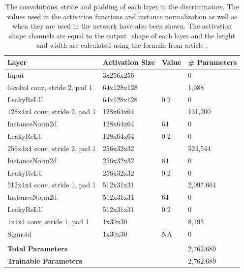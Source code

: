 \documentclass[12pt, fleqn, titlepage]{article}
\begin{document}
\begin{table}[H]
	\centering
	\begin{tabular}{llll}\toprule
		Layer                         & Activation Size & Value & \# Parameters \\ \midrule
		Input                         & 3x256x256       &       & 0             \\
		64x4x4 conv, stride 2, pad 1  & 64x128x128      &       & 1,088         \\
		LeakyReLU                     & 64x128x128      & 0.2   & 0             \\
		128x4x4 conv, stride 2, pad 1 & 128x64x64       &       & 131,200       \\
		InstanceNorm2d                & 128x64x64       & 64    & 0             \\
		LeakyReLU                     & 128x64x64       & 0.2   & 0             \\
		256x4x4 conv, stride 2, pad 1 & 256x32x32       &       & 524,544       \\
		InstanceNorm2d                & 256x32x32       & 64    & 0             \\
		LeakyReLU                     & 256x32x32       & 0.2   & 0             \\
		512x4x4 conv, stride 1, pad 1 & 512x31x31       &       & 2,097,664     \\
		InstanceNorm2d                & 512x31x31       & 64    & 0             \\
		LeakyReLU                     & 512x31x31       & 0.2   & 0             \\
		1x4x4 conv, stride 1, pad 1   & 1x30x30         &       & 8,193         \\
		Sigmoid                       & 1x30x30         & NA    & 0             \\
		                              &                 &       &               \\
		\textbf{Total Parameters}     &                 &       & 2,762,689     \\
		\textbf{Trainable Parameters} &                 &       & 2,762,689     \\ \bottomrule
	\end{tabular}
	\caption{The convolutions, stride and padding of each layer in the discriminators. The values used in the activation functions and instance normalization as well as when they are used in the network have also been shown. The activation shape channels are equal to the output\_shape of each layer and the height and width are calculated using the formula from article \protect\cite{calculate_activation_shape}.}
	\label{tab:discriminator_layers}
\end{table}
\end{document}
